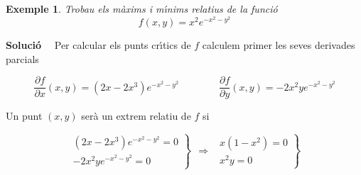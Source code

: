 \documentclass[12pt]{article}
\newcommand{\solucio}{\textbf{Soluci{\'o}}\ \ }
\newtheorem{exemple}{Exemple}[subsection]
\begin{document}
%
%
%
%
%
%
%
%
%


\vspace{0.4cm}
\begin{exemple}
Trobau  els m{\`a}xims i m{\'\i}nims relatius de la
funci{\'o}
\[
f (x, y) = x ^ 2 e ^{-x ^ 2-y ^ 2}
\]
\end{exemple}

\solucio
Per calcular els punts cr{\'\i}tics de $ f $ calculem primer les seves
derivades parcials

$$
\frac{\partial f}{\partial x} (x, y)  =  (2x-2x ^ 3) e ^{-x ^ 2-y ^ 2}
\qquad\qquad
\frac{\partial f}{\partial y} (x, y)  =    -2x ^ 2y e ^{-x ^ 2-y ^ 2}
$$

Un punt $ (x, y) $ ser{\`a} un extrem relatiu de $ f $ si

\[
\left.
\begin{array}{r}
  (2x-2x ^ 3) e ^{-x ^ 2-y ^ 2} = 0 \\   -2x ^ 2ye ^{-x ^ 2-y ^ 2} = 0
\end{array}
\right \} \, \; \Longrightarrow \, \; \left.
\begin{array}{r}
  x (1-x ^ 2) = 0 \\   x ^ 2y = 0
\end{array}
\right \}
\]
\end{document}

